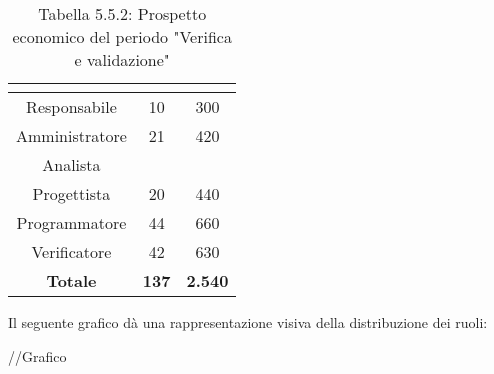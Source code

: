 \renewcommand{\arraystretch}{1.5}
\begin{table}[H]
\begin{center}
\begin{tabular}{|c|c|c|}
\hline
\rowcolor{title_row}
\textbf{\color{title_text}{Ruolo}}  & \textbf{\color{title_text}{Ore}} & \textbf{\color{title_text}{Costo in \euro}} \\ \hline
Responsabile    & 10 & 300 \\ \hline
Amministratore  & 21 & 420 \\ \hline
Analista        & & \\ \hline
Progettista     & 20 & 440 \\ \hline
Programmatore   & 44 & 660 \\ \hline
Verificatore    & 42 & 630 \\ \hline
\textbf{Totale} & \textbf{137}    & \textbf{2.540}           \\ \hline
\end{tabular}
\caption{Tabella 5.5.2: Prospetto economico del periodo "Verifica e validazione"\label{}}
\end{center}
\end{table}
\renewcommand{\arraystretch}{1}

Il seguente grafico dà una rappresentazione visiva della distribuzione dei ruoli: \\
\begin{center}
//Grafico
\end{center}
 
\pagebreak